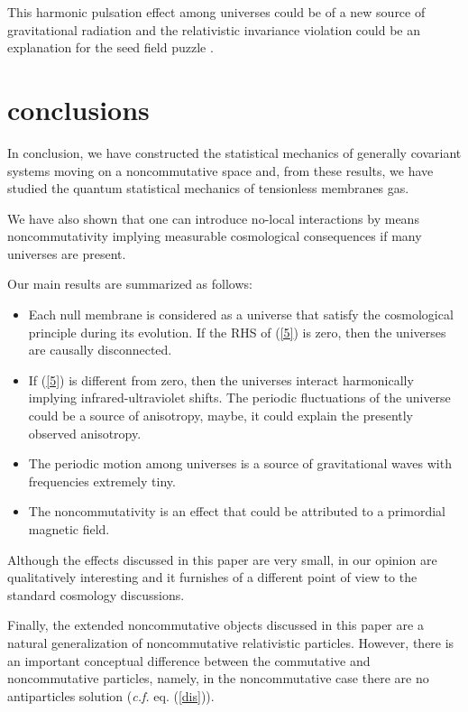 \documentclass[a4paper,aps,twocolumn,amsfonts]{revtex4}
\begin{document}
   This  harmonic pulsation effect among universes could be of a new source of gravitational radiation and the relativistic invariance violation could be an explanation for the seed field puzzle \cite{ru}. 

   \section{conclusions}

   In conclusion, we have constructed the statistical mechanics of generally covariant systems moving on a noncommutative space and, from these results, we have studied the quantum statistical mechanics of tensionless membranes gas.

   We have also shown that one can  introduce no-local interactions by means noncommutativity  implying measurable cosmological consequences if many universes are present.

   Our main results are summarized as follows:
   \begin{itemize}
   \item{}Each null membrane is considered as a universe that satisfy the cosmological principle during its evolution.  If the RHS of (\ref{5}) is zero, then the universes are causally disconnected.

   \item{}If (\ref{5}) is different from zero, then the universes interact harmonically implying infrared-ultraviolet shifts. The periodic fluctuations of the universe could be a source of anisotropy, maybe, it could explain the presently observed anisotropy.

   \item{}The periodic motion among universes is a source of gravitational waves with frequencies extremely tiny. 
   
    \item{} The noncommutativity is an effect that could be attributed to a primordial magnetic field. 
   \end{itemize}
   
   Although the effects discussed in this paper are very small, in our opinion are qualitatively interesting and it furnishes of a different point of view to the standard cosmology discussions.

Finally, the extended noncommutative objects discussed in this paper are a natural generalization of noncommutative relativistic particles. However, there is an important conceptual difference between the commutative and noncommutative particles, namely, in the noncommutative case there are no antiparticles solution ({\it c.f.} eq. (\ref{dis})). 
\end{document}
